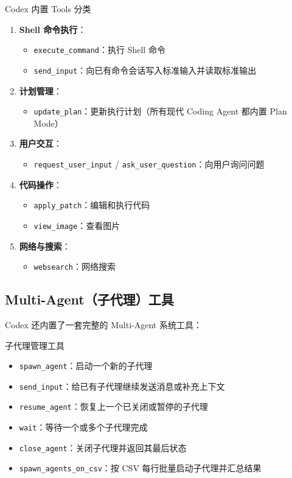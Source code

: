 \begin{importantbox}{Codex 内置 Tools 分类}
\begin{enumerate}
    \item \textbf{Shell 命令执行}：
    \begin{itemize}
        \item \texttt{execute\_command}：执行 Shell 命令
        \item \texttt{send\_input}：向已有命令会话写入标准输入并读取标准输出
    \end{itemize}
    \item \textbf{计划管理}：
    \begin{itemize}
        \item \texttt{update\_plan}：更新执行计划（所有现代 Coding Agent 都内置 Plan Mode）
    \end{itemize}
    \item \textbf{用户交互}：
    \begin{itemize}
        \item \texttt{request\_user\_input} / \texttt{ask\_user\_question}：向用户询问问题
    \end{itemize}
    \item \textbf{代码操作}：
    \begin{itemize}
        \item \texttt{apply\_patch}：编辑和执行代码
        \item \texttt{view\_image}：查看图片
    \end{itemize}
    \item \textbf{网络与搜索}：
    \begin{itemize}
        \item \texttt{websearch}：网络搜索
    \end{itemize}
\end{enumerate}
\end{importantbox}

\subsection{Multi-Agent（子代理）工具}

Codex 还内置了一套完整的 Multi-Agent 系统工具：

\begin{importantbox}{子代理管理工具}
\begin{itemize}
    \item \texttt{spawn\_agent}：启动一个新的子代理
    \item \texttt{send\_input}：给已有子代理继续发送消息或补充上下文
    \item \texttt{resume\_agent}：恢复上一个已关闭或暂停的子代理
    \item \texttt{wait}：等待一个或多个子代理完成
    \item \texttt{close\_agent}：关闭子代理并返回其最后状态
    \item \texttt{spawn\_agents\_on\_csv}：按 CSV 每行批量启动子代理并汇总结果
\end{itemize}
\end{importantbox}

